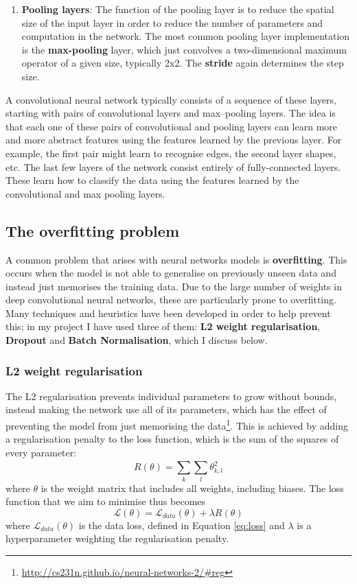 \documentclass[12pt,a4paper,twoside,openright]{report}
\begin{document}
\begin{enumerate}
	\item \textbf{Pooling layers}: The function of the pooling layer is to reduce the spatial size of the input layer in order to reduce the number of parameters and computation in the network. The most common pooling layer implementation is the \textbf{max-pooling} layer, which just convolves a two-dimensional maximum operator of a given size, typically 2x2. The \textbf{stride} again determines the step size.

\end{enumerate}

A convolutional neural network typically consists of a sequence of these layers, starting with pairs of convolutional layers and max--pooling layers. The idea is that each one of these pairs of convolutional and pooling layers can learn more and more abstract features using the features learned by the previous layer. For example, the first pair might learn to recognise edges, the second layer shapes, etc. The last few layers of the network consist entirely of fully-connected layers. These learn how to classify the data using the features learned by the convolutional and max pooling layers.

\subsection{The overfitting problem}
A common problem that arises with neural networks models is \textbf{overfitting}. This occurs when the model is not able to generalise on previously unseen data and instead just memorises the training data. Due to the large number of weights in deep convolutional neural networks, these are particularly prone to overfitting. Many techniques and heuristics have been developed in order to help prevent this; in my project I have used three of them: \textbf{L2 weight regularisation}, \textbf{Dropout} and \textbf{Batch Normalisation}, which I discuss below.

\subsubsection{\textbf{L2} weight regularisation}
The L2 regularisation prevents individual parameters to grow without bounds, instead making the network use all of its parameters, which has the effect of preventing the model from just memorising the data\footnote{\url{http://cs231n.github.io/neural-networks-2/\#reg}}. This is achieved by adding a regularisation penalty to the loss function, which is the sum of the squares of every parameter:
\begin{equation}
	R(\theta) = \sum_{k}^{} \sum_{l}^{} \theta_{k,l}^2
\end{equation} 
where $\theta$ is the weight matrix that includes all weights, including biases.
The loss function that we aim to minimise thus becomes
\begin{equation}
	\mathcal{L}(\theta) = \mathcal{L}_{data}(\theta) + \lambda R(\theta) 
\end{equation}
where $\mathcal{L}_{data}(\theta)$ is the data loss, defined in Equation \ref{eq:loss} and $\lambda$ is a hyperparameter weighting the regularisation penalty. 
\end{document}

